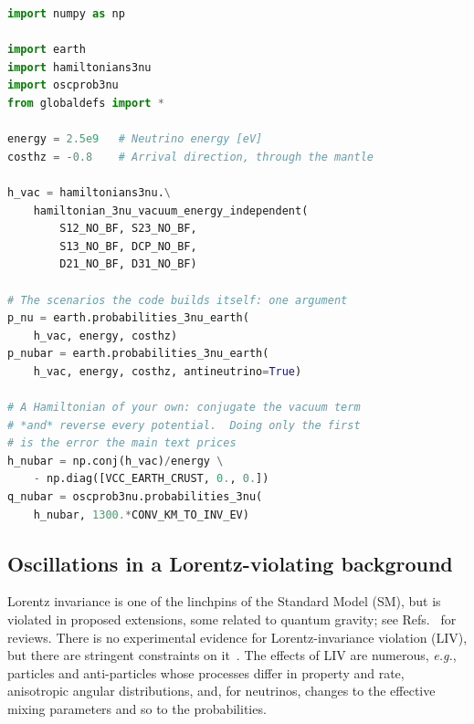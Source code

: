 \documentclass[final,5p,times,twocolumn,sort,compress]{elsarticle}
\newcommand{\eg}{{\it e.g.}}
\newcommand{\eq}{Eq.}
\newcommand{\Refs}{Refs.}
\newcommand{\equ}[1]{\eq~(\ref{equ:#1})}
\begin{document}
\begin{lstlisting}[language=Python, caption={Antineutrinos, by either route.  For the scenarios the code builds itself, {\tt antineutrino=True} conjugates the vacuum term and reverses every potential, slab by slab along a chord and for both potentials when a fourth flavor is present.  For a Hamiltonian the user supplies, \equ{antineutrino} is written out instead; both of its operations are needed, and the text gives the cost of doing one.}, label={lst:antineutrinos}, float=t]
import numpy as np

import earth
import hamiltonians3nu
import oscprob3nu
from globaldefs import *

energy = 2.5e9   # Neutrino energy [eV]
costhz = -0.8    # Arrival direction, through the mantle

h_vac = hamiltonians3nu.\
    hamiltonian_3nu_vacuum_energy_independent(
        S12_NO_BF, S23_NO_BF,
        S13_NO_BF, DCP_NO_BF,
        D21_NO_BF, D31_NO_BF)

# The scenarios the code builds itself: one argument
p_nu = earth.probabilities_3nu_earth(
    h_vac, energy, costhz)
p_nubar = earth.probabilities_3nu_earth(
    h_vac, energy, costhz, antineutrino=True)

# A Hamiltonian of your own: conjugate the vacuum term
# *and* reverse every potential.  Doing only the first
# is the error the main text prices
h_nubar = np.conj(h_vac)/energy \
    - np.diag([VCC_EARTH_CRUST, 0., 0.])
q_nubar = oscprob3nu.probabilities_3nu(
    h_nubar, 1300.*CONV_KM_TO_INV_EV)
\end{lstlisting}

\subsection{Oscillations in a Lorentz-violating background}
\label{sec:prob_3nu_liv}

Lorentz invariance is one of the linchpins of the Standard Model (SM), but is violated in proposed extensions, some related to quantum gravity; see \Refs\ \cite{Mavromatos:2004sz, Liberati:2009pf, Liberati:2013xla, Tasson:2014dfa} for reviews.  There is no experimental evidence for Lorentz-invariance violation (LIV), but there are stringent constraints on it\ \cite{Kostelecky:2008ts, IceCube:2010fyu, Abe:2014wla, Aartsen:2017ibm}.  The effects of LIV are numerous, \eg, particles and anti-particles whose processes differ in property and rate, anisotropic angular distributions, and, for neutrinos, changes to the effective mixing parameters and so to the probabilities.
\end{document}

